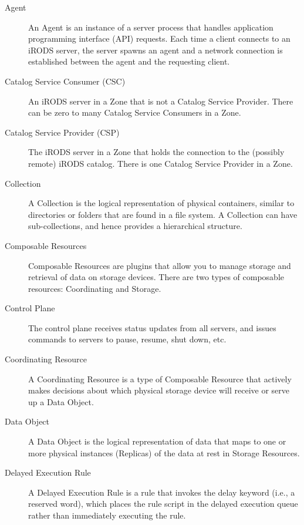 \documentclass[10pt,oneside]{memoir}
\begin{document}
\begin{description}

\item [Agent]
An Agent is an instance of a server process that handles application programming interface (API) requests. Each time a client connects to an iRODS server, the server spawns an agent and a network connection is established between the agent and the requesting client.

\item [Catalog Service Consumer (CSC)]
An iRODS server in a Zone that is not a Catalog Service Provider. There can be zero to many Catalog Service Consumers in a Zone.

\item [Catalog Service Provider (CSP)]
The iRODS server in a Zone that holds the connection to the (possibly remote) iRODS catalog. There is one Catalog Service Provider in a Zone.

\item [Collection]
A Collection is the logical representation of physical containers, similar to directories or folders that are found in a file system. A Collection can have sub-collections, and hence provides a hierarchical structure.

\item [Composable Resources]
Composable Resources are plugins that allow you to manage storage and retrieval of data on storage devices. There are two types of composable resources: Coordinating and Storage.

\item [Control Plane]
The control plane receives status updates from all servers, and issues commands to servers to pause, resume, shut down, etc.

\item [Coordinating Resource]
A Coordinating Resource is a type of Composable Resource that actively makes decisions about which physical storage device will receive or serve up a Data Object.

\item [Data Object]
A Data Object is the logical representation of data that maps to one or more physical instances (Replicas) of the data at rest in Storage Resources.

\item [Delayed Execution Rule]
A Delayed Execution Rule is a rule that invokes the delay keyword (i.e., a reserved word), which places the rule script in the delayed execution queue rather than immediately executing the rule.


\end{description}
\end{document}
